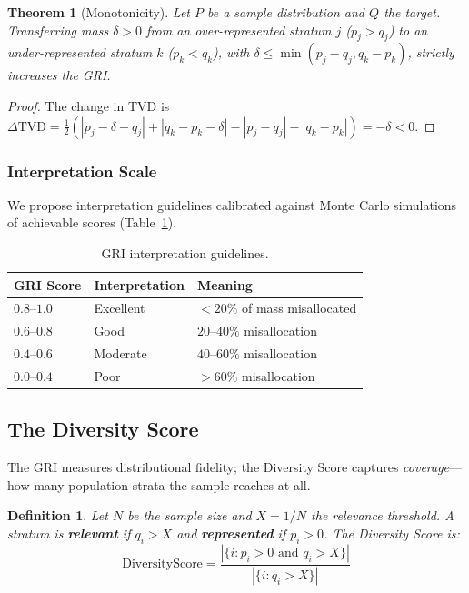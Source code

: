 \documentclass[11pt,a4paper]{article}
\newtheorem{theorem}{Theorem}
\newtheorem{definition}{Definition}
\begin{document}
\begin{theorem}[Monotonicity]\label{thm:mono}
Let $P$ be a sample distribution and $Q$ the target. Transferring mass $\delta > 0$ from an over-represented stratum $j$ ($p_j > q_j$) to an under-represented stratum $k$ ($p_k < q_k$), with $\delta \leq \min(p_j - q_j, q_k - p_k)$, strictly increases the GRI.
\end{theorem}
\begin{proof}
The change in TVD is $\Delta\text{TVD} = \frac{1}{2}(|p_j - \delta - q_j| + |q_k - p_k - \delta| - |p_j - q_j| - |q_k - p_k|) = -\delta < 0$.
\end{proof}

\subsubsection{Interpretation Scale}

We propose interpretation guidelines calibrated against Monte Carlo simulations of achievable scores (Table~\ref{tab:interpretation}).

\begin{table}[ht]
\centering
\caption{GRI interpretation guidelines.}
\label{tab:interpretation}
\begin{tabular}{@{}lll@{}}
\toprule
GRI Score & Interpretation & Meaning \\
\midrule
$0.8$--$1.0$ & Excellent & $<20\%$ of mass misallocated \\
$0.6$--$0.8$ & Good & $20$--$40\%$ misallocation \\
$0.4$--$0.6$ & Moderate & $40$--$60\%$ misallocation \\
$0.0$--$0.4$ & Poor & $>60\%$ misallocation \\
\bottomrule
\end{tabular}
\end{table}

\subsection{The Diversity Score}

The GRI measures distributional fidelity; the Diversity Score captures \emph{coverage}---how many population strata the sample reaches at all.

\begin{definition}
Let $N$ be the sample size and $X = 1/N$ the relevance threshold. A stratum is \textbf{relevant} if $q_i > X$ and \textbf{represented} if $p_i > 0$. The Diversity Score is:
\begin{equation}\label{eq:diversity}
    \text{DiversityScore} = \frac{|\{i : p_i > 0 \text{ and } q_i > X\}|}{|\{i : q_i > X\}|}
\end{equation}
\end{definition}
\end{document}

